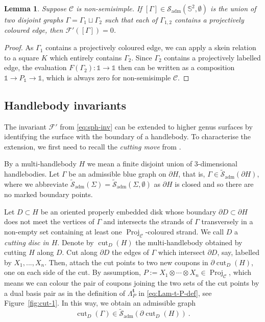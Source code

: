 \documentclass[11pt]{amsart}
\newtheorem{lemma}[thm]{Lemma}
\theoremstyle{definition}
\numberwithin{equation}{section}
\def\bd{{\partial}}
\def\mtr{{\mathbf{t}}} %
\newcommand{\Proj}{\operatorname{Proj}}
\def\adm{\operatorname{adm}}
\def\cgpt{\mathscr{F}}
\def\cut{{\operatorname{cut}}}
\def\sk{\cS}
\def\cC{\mathcal{C}}
\def\cS{\mathcal{S}}
\def\bS{{\mathbb{S}}}
\def\Ld{\Lambda}
\def\1{{\mathds{1}}}
\def\to{\rightarrow}
\newcommand{\ot}{\otimes}
\begin{document}
\begin{lemma}\label{lem:vanish-S2}
Suppose $\cC$ is non-semisimple.
If $[\Gamma] \in \sk_{\adm}(\bS^2, \emptyset)$ is the union of two disjoint graphs $\Gamma = \Gamma_1 \sqcup \Gamma_2$ such that each of $\Gamma_{1,2}$ contains a projectively coloured edge, then $\cgpt'([\Gamma])=0$.
\end{lemma}

\begin{proof}
As $\Gamma_1$ contains a projectively coloured edge, we can apply a skein relation to a square $K$ which entirely contains $\Gamma_2$. Since $\Gamma_2$ contains a projectively labelled edge, the evaluation $F(\Gamma_2) : \1 \to \1$ then can be written as a composition $\1 \to P_\1 \to \1$, which is always zero for non-semisimple  $\cC$.
\end{proof}

\subsection{Handlebody invariants}\label{sec:handlebody-inv}

The invariant $\cgpt'$ from \eqref{eq:sph-inv} can be extended to higher genus surfaces by identifying the surface with the boundary of a handlebody. To characterise the extension, we first need to recall the \textit{cutting move} from \cite{CGPT20-Kup}. 

By a multi-handlebody $H$ we mean a finite disjoint union of 3-dimensional handlebodies.
Let $\Gamma$ be an admissible blue graph on $\bd H$, that is, $\Gamma \in \tilde{\sk}_{\adm}(\bd H)$, where we abbreviate $\tilde{\sk}_{\adm}(\Sigma) = \tilde{\sk}_{\adm}(\Sigma,\emptyset)$ as $\bd H$ is closed and so there are no marked boundary points.

Let $D \subset H$ be an oriented properly embedded disk whose boundary $\bd D\subset \bd H$ does not meet the vertices of $\Gamma$ and intersects the strands of $\Gamma$ transversely in a non-empty set containing at least one $\Proj_\cC$-coloured strand. We call $D$ a \textit{cutting disc in $H$}.
Denote by $\cut_D(H)$ the multi-handlebody obtained by cutting $H$ along $D$. 
Cut along $\bd D$ the edges of $\Gamma$ which intersect $\bd D$, say, labelled by $X_1, ..., X_n$. Then, attach the cut points to two new coupons in $\bd\cut_D(H)$, one on each side of the cut. 
By assumption, $P := X_1 \ot \cdots \ot X_n \in \Proj_\cC$, which means we can colour the pair of coupons joining the two sets of the cut points by a dual basis pair as in the definition of $\Ld^{\mtr}_{P}$ in \eqref{eq:Lam-t-P-def}, see Figure~\ref{fig:cut-1}.
In this way, we obtain an admissible graph
\begin{equation}
    \cut_D(\Gamma) \in \tilde{\sk}_{\adm}(\bd \cut_D(H)) \ .
\end{equation}
\end{document}
